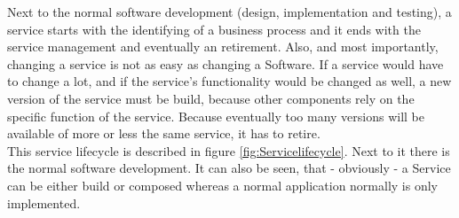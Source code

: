 \documentclass[12pt]{article}
\begin{document}
Next to the normal software development (design, implementation and testing), a service starts with the identifying of a business process and it ends with the service management and eventually an retirement. Also, and most importantly, changing a service is not as easy as changing a Software. If a service would have to change a lot, and if the service's functionality would be changed as well, a new version of the service must be build, because other components rely on the specific function of the service. Because eventually too many versions will be available of more or less the same service, it has to retire.\\ This service lifecycle is described in figure \ref{fig:Servicelifecycle}. Next to it there is the normal software development. It can also be seen, that - obviously - a Service can be either build or composed whereas a normal application normally is only implemented.
\\
\end{document}
